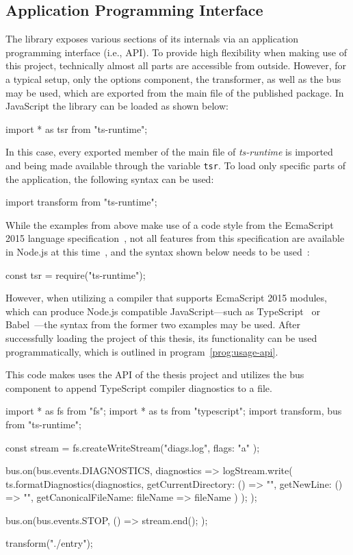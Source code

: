 \subsection{Application Programming Interface}
\label{sec:usage-api}

The library exposes various sections of its internals via an application programming interface (i.e., API). To provide high flexibility when making use of this project, technically almost all parts are accessible from outside. However, for a typical setup, only the options component, the transformer, as well as the bus may be used, which are exported from the main file of the published package. In JavaScript the library can be loaded as shown below:
\begin{JsCode}[numbers=none]
import * as tsr from "ts-runtime";
\end{JsCode}
In this case, every exported member of the main file of \emph{ts-runtime} is imported and being made available through the variable \texttt{tsr}. To load only specific parts of the application, the following syntax can be used:
\begin{JsCode}[numbers=none]
import { transform } from "ts-runtime";
\end{JsCode}
While the examples from above make use of a code style from the EcmaScript 2015 language specification~\cite[p.~302]{ES6Spec:Ecma:2015}, not all features from this specification are available in Node.js at this time~\cite{Node:Docs:ES6}, and the syntax shown below needs to be used~\cite{Node:API:Modules}:
\begin{JsCode}[numbers=none]
const tsr = require("ts-runtime");
\end{JsCode}
However, when utilizing a compiler that supports EcmaScript 2015 modules, which can produce Node.js compatible JavaScript---such as TypeScript~\cite{TypeScriptHandbook:Modules} or Babel~\cite{Babel:Plugins}---the syntax from the former two examples may be used. After successfully loading the project of this thesis, its functionality can be used programmatically, which is outlined in program~\ref{prog:usage-api}.
\begin{program}
\caption{This code makes uses the API of the thesis project and utilizes the bus component to append TypeScript compiler diagnostics to a file.}
\label{prog:usage-api}
\begin{JsCode}
import * as fs from "fs";
import * as ts from "typescript";
import { transform, bus } from "ts-runtime";

const stream = fs.createWriteStream("diags.log", { flags: "a" });

bus.on(bus.events.DIAGNOSTICS, diagnostics => {
  logStream.write(
    ts.formatDiagnostics(diagnostics, {
      getCurrentDirectory: () => "",
      getNewLine: () => "\n",
      getCanonicalFileName: fileName => fileName
    })
  );
});

bus.on(bus.events.STOP, () => {
  stream.end();
});

transform("./entry");
\end{JsCode}
\end{program}

